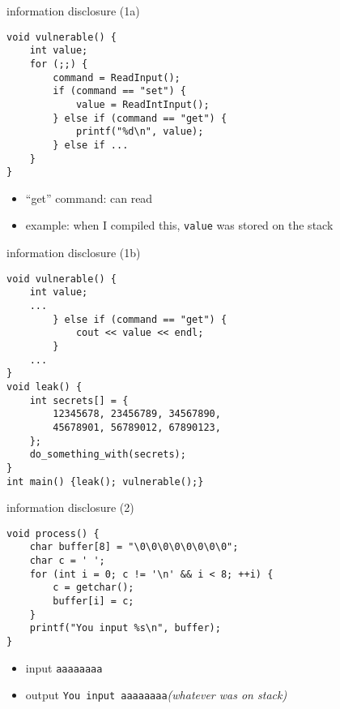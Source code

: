 \begin{frame}[fragile,label=infoDisc1a]{information disclosure (1a)}
\lstset{
    language=C++,
    style=small
}
\begin{lstlisting}
void vulnerable() {
    int value;
    for (;;) {
        command = ReadInput();
        if (command == "set") {
            value = ReadIntInput();
        } else if (command == "get") {
            printf("%d\n", value);
        } else if ...
    }
}
\end{lstlisting}
\begin{itemize}
\item ``get'' command: can read 
\item example: when I compiled this, \texttt{value} was stored on the stack
\end{itemize}
\end{frame}

\begin{frame}[fragile,label=infoDisc1b]{information disclosure (1b)}
\lstset{
    language=C++,
    style=smaller
}
\begin{lstlisting}
void vulnerable() {
    int value;
    ...
        } else if (command == "get") {
            cout << value << endl;
        }
    ...
}
void leak() {
    int secrets[] = { 
        12345678, 23456789, 34567890,
        45678901, 56789012, 67890123,
    };  
    do_something_with(secrets);
}
int main() {leak(); vulnerable();}
\end{lstlisting}
\end{frame}

\begin{frame}[fragile,label=infoDisc2]{information disclosure (2)}
\lstset{
    language=C,
    style=small
}
\begin{lstlisting}
void process() {
    char buffer[8] = "\0\0\0\0\0\0\0\0";
    char c = ' ';
    for (int i = 0; c != '\n' && i < 8; ++i) {
        c = getchar();
        buffer[i] = c;
    }
    printf("You input %s\n", buffer);
}
\end{lstlisting}
\begin{itemize}
\item input \verb|aaaaaaaa|
\item output \verb|You input aaaaaaaa|{\it (whatever was on stack)}
\end{itemize}
\end{frame}

